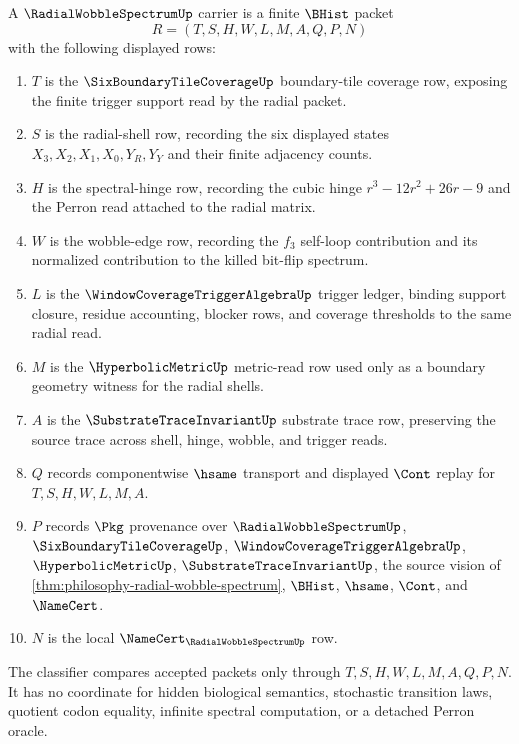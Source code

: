 \begin{definition}
\label{def:radial-wobble-spectrum-carrier}
A $\RadialWobbleSpectrumUp$ carrier is a finite $\BHist$ packet
$$
R=(T,S,H,W,L,M,A,Q,P,N)
$$
with the following displayed rows:
\begin{enumerate}
\item $T$ is the $\SixBoundaryTileCoverageUp$ boundary-tile coverage row, exposing the finite trigger support read by the radial packet.
\item $S$ is the radial-shell row, recording the six displayed states $X_{3},X_{2},X_{1},X_{0},Y_{R},Y_{Y}$ and their finite adjacency counts.
\item $H$ is the spectral-hinge row, recording the cubic hinge $r^{3}-12r^{2}+26r-9$ and the Perron read attached to the radial matrix.
\item $W$ is the wobble-edge row, recording the $f_{3}$ self-loop contribution and its normalized contribution to the killed bit-flip spectrum.
\item $L$ is the $\WindowCoverageTriggerAlgebraUp$ trigger ledger, binding support closure, residue accounting, blocker rows, and coverage thresholds to the same radial read.
\item $M$ is the $\HyperbolicMetricUp$ metric-read row used only as a boundary geometry witness for the radial shells.
\item $A$ is the $\SubstrateTraceInvariantUp$ substrate trace row, preserving the source trace across shell, hinge, wobble, and trigger reads.
\item $Q$ records componentwise $\hsame$ transport and displayed $\Cont$ replay for $T,S,H,W,L,M,A$.
\item $P$ records $\Pkg$ provenance over $\RadialWobbleSpectrumUp$, $\SixBoundaryTileCoverageUp$, $\WindowCoverageTriggerAlgebraUp$, $\HyperbolicMetricUp$, $\SubstrateTraceInvariantUp$, the source vision of \autoref{thm:philosophy-radial-wobble-spectrum}, $\BHist$, $\hsame$, $\Cont$, and $\NameCert$.
\item $N$ is the local $\NameCert_{\RadialWobbleSpectrumUp}$ row.
\end{enumerate}
The classifier compares accepted packets only through $T,S,H,W,L,M,A,Q,P,N$. It has no coordinate for hidden biological semantics, stochastic transition laws, quotient codon equality, infinite spectral computation, or a detached Perron oracle.
\end{definition}

